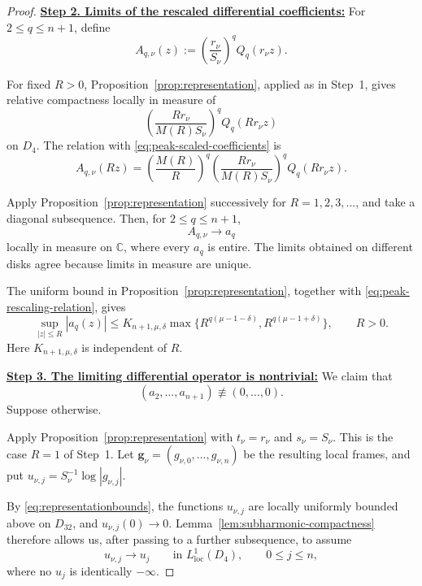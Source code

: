 \documentclass[12pt,letterpaper,reqno]{amsart}
\theoremstyle{definition}
\numberwithin{equation}{section}
\newcommand{\C}{\mathbb C}
\newcommand{\loc}{\mathrm{loc}}
\newcommand{\gv}{\bm g}
\begin{document}
\begin{proof}
\medskip\noindent
\textbf{\underline{Step 2. Limits of the rescaled differential coefficients:}}
For \(2\leq q\leq n+1\), define
\begin{equation}\label{eq:peak-scaled-coefficients}
 A_{q,\nu}(z)
 :=
 \left(\frac{r_\nu}{S_\nu}\right)^q
 Q_q(r_\nu z).
\end{equation}

For fixed \(R>0\), Proposition~\ref{prop:representation}, applied as in
Step~1, gives relative compactness locally in measure of
\[
\left(
\frac{Rr_\nu}{M(R)S_\nu}
\right)^q
Q_q(Rr_\nu z)
\]
on \(D_4\). The relation with \eqref{eq:peak-scaled-coefficients} is
\begin{equation}\label{eq:peak-rescaling-relation}
 A_{q,\nu}(Rz)
 =
 \left(\frac{M(R)}{R}\right)^q
 \left(
 \frac{Rr_\nu}{M(R)S_\nu}
 \right)^q
 Q_q(Rr_\nu z).
\end{equation}

Apply Proposition~\ref{prop:representation} successively for
\(R=1,2,3,\ldots\), and take a diagonal subsequence. Then, for
\(2\leq q\leq n+1\),
\[
A_{q,\nu}\longrightarrow a_q
\]
locally in measure on \(\C\), where every \(a_q\) is entire.
The limits obtained on different disks agree because limits in measure
are unique.

The uniform bound in Proposition~\ref{prop:representation}, together
with \eqref{eq:peak-rescaling-relation}, gives
\begin{equation}\label{eq:peak-coefficient-bound}
 \sup_{|z|\leq R}|a_q(z)|
 \leq
 K_{n+1,\mu,\delta}
 \max\{
 R^{q(\mu-1-\delta)},
 R^{q(\mu-1+\delta)}
 \},
 \qquad
 R>0.
\end{equation}
Here \(K_{n+1,\mu,\delta}\) is independent of \(R\).


\medskip\noindent
\textbf{\underline{Step 3. The limiting differential operator is nontrivial:}}
We claim that
\[
(a_2,\ldots,a_{n+1})\not\equiv(0,\ldots,0).
\]
Suppose otherwise.

Apply Proposition~\ref{prop:representation} with
\(t_\nu=r_\nu\) and \(s_\nu=S_\nu\). This is the case \(R=1\) of
Step~1. Let
\(\gv_\nu=(g_{\nu,0},\ldots,g_{\nu,n})\)
be the resulting local frames, and put
\(u_{\nu,j}=S_\nu^{-1}\log|g_{\nu,j}|\).

By \eqref{eq:representationbounds}, the functions \(u_{\nu,j}\) are
locally uniformly bounded above on \(D_{32}\), and
\(u_{\nu,j}(0)\to0\). Lemma~\ref{lem:subharmonic-compactness} therefore
allows us, after passing to a further subsequence, to assume
\begin{equation}\label{eq:peak-component-limits}
 u_{\nu,j}
 \longrightarrow
 u_j
 \qquad\text{in }L^1_{\loc}(D_4),
 \qquad
 0\leq j\leq n,
\end{equation}
where no \(u_j\) is identically \(-\infty\).


\end{proof}
\end{document}
